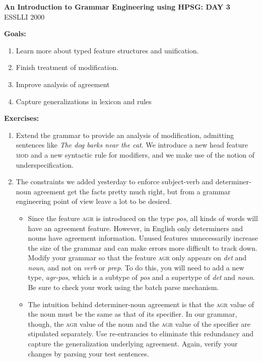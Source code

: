 \documentclass[10pt]{article}
\begin{document}
\begin{center}
\textbf{An Introduction to Grammar Engineering using HPSG: DAY 3}\\
ESSLLI 2000
\end{center}

\medskip
\textbf{Goals:}
\begin{enumerate}
\item Learn more about typed feature structures and unification.
\item Finish treatment of modification.
\item Improve analysis of agreement
\item Capture generalizations in lexicon and rules
\end{enumerate}

\smallskip
\textbf{Exercises:}
\begin{enumerate}
\item Extend the grammar to provide an analysis of modification, admitting
sentences like \emph{The dog barks near the cat}.  We introduce a new head
feature \textsc{mod} and a new syntactic rule for modifiers, and we make use
of the notion of underspecification.

\item The constraints we added yesterday to enforce subject-verb and
determiner-noun agreement get the facts pretty much right, but from a grammar
engineering point of view leave a lot to be desired. 

\begin{itemize}
\item Since the feature \textsc{agr} is introduced on the type \emph{pos}, all 
kinds of words will have an agreement feature.  However, in English only
determiners and nouns have agreement information.  Unused features
unnecessarily increase the size of the grammar and can make errors more
difficult to track down. Modify your grammar so that the feature \textsc{agr}
only appears on \emph{det} and \emph{noun}, and not on \emph{verb} or
\emph{prep}.  To do this, you will need to add a new type,
\emph{agr-pos}, which is a subtype of \emph{pos} and a supertype of \emph{det} 
and \emph{noun}. Be sure to check your work using the batch parse mechanism.

\item The intuition behind determiner-noun agreement is that the \textsc{agr}
value of the noun must be the same as that of its specifier.  In our grammar,
though, the \textsc{agr} value of the noun and the \textsc{agr} value of the
specifier are stipulated separately.  Use re-entrancies to eliminate this
redundancy and capture the generalization underlying agreement. Again, verify
your changes by parsing your test sentences.


\end{itemize}
\end{enumerate}
\end{document}

